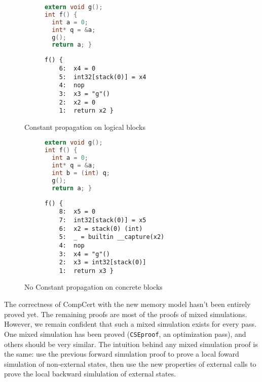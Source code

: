 \label{sec:eval}
\begin{figure}[H]
\begin{subfigure}{.48\textwidth}
  \begin{lstlisting}[language=C,basicstyle=\small]
extern void g();
int f() {
  int a = 0;
  int* q = &a;
  g();
  return a; }
\end{lstlisting}
\end{subfigure}
\begin{subfigure}{.48\textwidth}
  \begin{lstlisting}[basicstyle=\small]
f() {
    6:	x4 = 0
    5:	int32[stack(0)] = x4
    4:	nop
    3:	x3 = "g"()
    2:	x2 = 0
    1:	return x2 }
\end{lstlisting}
\end{subfigure}
\caption{Constant propagation on logical blocks}
\label{fig:cplogical}
\end{figure}
\begin{figure}[H]
\begin{subfigure}{.48\textwidth}
  \begin{lstlisting}[language=C,basicstyle=\small]
extern void g();
int f() {
  int a = 0;
  int* q = &a;
  int b = (int) q;
  g();
  return a; }
\end{lstlisting}
\end{subfigure}
\begin{subfigure}{.48\textwidth}
  \begin{lstlisting}[basicstyle=\small]
f() {
    8:	x5 = 0
    7:	int32[stack(0)] = x5
    6:	x2 = stack(0) (int)
    5:	_ = builtin __capture(x2)
    4:	nop
    3:	x4 = "g"()
    2:	x3 = int32[stack(0)]
    1:	return x3 }
\end{lstlisting}
\end{subfigure}
\caption{No Constant propagation on concrete blocks}
\label{fig:cpconcrete}
\end{figure}

The correctness of CompCert with the new memory model hasn't been entirely proved yet.
The remaining proofs are most of the proofs of mixed simulations.
However, we remain confident that such a mixed simulation exists for every pass. One mixed simulation has been proved (\texttt{CSEproof}, an optimization pass), and others should be very similar. The intuition behind any mixed simulation proof is the same: use the previous forward simulation proof to prove a local foward simulation of non-external states, then use the new properties of external calls to prove the local backward simlulation of external states.

